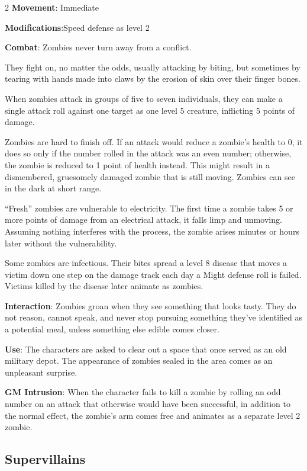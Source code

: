 \begin{multicols}{2}
\textbf{Movement}: Immediate

\textbf{Modifications}:Speed defense as level 2

\textbf{Combat}: Zombies never turn away from a conflict.

They fight on, no matter the odds, usually attacking by biting, but sometimes by tearing with hands made into claws by the erosion of skin over their finger bones.

When zombies attack in groups of five to seven individuals, they can make a single attack roll against one target as one level 5 creature, inflicting 5 points of damage.

Zombies are hard to finish off. If an attack would reduce a zombie’s health to 0, it does so only if the number rolled in the attack was an even number; otherwise, the zombie is reduced to 1 point of health instead. This might result in a dismembered, gruesomely damaged zombie that is still moving. Zombies can see in the dark
at short range.

“Fresh” zombies are vulnerable to electricity. The first time a zombie takes 5 or more points of damage from an electrical attack, it falls limp and unmoving. Assuming nothing interferes with the process, the zombie arises minutes or hours later without the vulnerability.

Some zombies are infectious. Their bites spread a level 8 disease that moves a victim down one step on the damage track each day a Might defense roll is failed. Victims killed by the disease later animate as zombies.

\textbf{Interaction}: Zombies groan when they see something that looks tasty. They do not reason, cannot speak, and never stop pursuing something they’ve identified as a potential meal, unless something else edible comes closer.

\textbf{Use}: The characters are asked to clear out a space that once served as an old military depot. The appearance of zombies sealed in the area comes as an unpleasant surprise.

\textbf{GM Intrusion}: When the character fails to kill a zombie by rolling an odd number on an attack that otherwise would have been successful, in addition to the normal effect, the zombie’s arm comes free and animates as a separate level 2 zombie.

\subsection{Supervillains}


\end{multicols}
